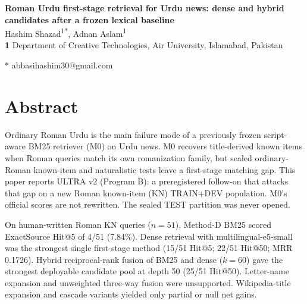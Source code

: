 \documentclass[10pt,letterpaper]{article}
\begin{document}
\vspace*{0.2in}

\begin{flushleft}
{\Large
\textbf{Roman {Urdu} first-stage retrieval for {Urdu} news: dense and hybrid candidates after a frozen lexical baseline}
}
\newline
\\
Hashim Shazad\textsuperscript{1*},
Adnan Aslam\textsuperscript{1}
\\
\bigskip
\textbf{1} Department of Creative Technologies, Air University, Islamabad, Pakistan
\\
\bigskip

* abbasihashim30@gmail.com

\end{flushleft}

\section*{Abstract}
Ordinary Roman Urdu is the main failure mode of a previously frozen script-aware BM25 retriever (M0) on Urdu news. M0 recovers title-derived known items when Roman queries match its own romanization family, but sealed ordinary-Roman known-item and naturalistic tests leave a first-stage matching gap. This paper reports ULTRA v2 (Program B): a preregistered follow-on that attacks that gap on a new Roman known-item (KN) TRAIN+DEV population. M0's official scores are not rewritten. The sealed TEST partition was never opened.

On human-written Roman KN queries ($n = 51$), Method-D BM25 scored ExactSource Hit@5 of 4/51 (7.84\%). Dense retrieval with multilingual-e5-small was the strongest single first-stage method (15/51 Hit@5; 22/51 Hit@50; MRR 0.1726). Hybrid reciprocal-rank fusion of BM25 and dense ($k = 60$) gave the strongest deployable candidate pool at depth 50 (25/51 Hit@50). Letter-name expansion and unweighted three-way fusion were unsupported. Wikipedia-title expansion and cascade variants yielded only partial or null net gains.
\end{document}
